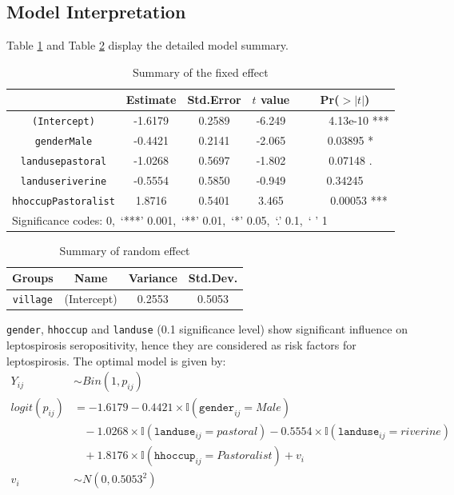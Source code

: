 \documentclass[11pt,twoside]{article}
\numberwithin{Theorem}{section}
\numberwithin{Definition}{section}
\numberwithin{Lemma}{section}
\numberwithin{Algorithm}{section}
\numberwithin{equation}{section}
\begin{document}
\subsection{Model Interpretation}

Table \ref{tab:summary2} and Table \ref{tab:summary3} display the detailed model summary.

\begin{table}[!h]
	\centering
	\begin{tabular}{|c|c|c|c|c|}
		\hline
		 & Estimate & Std.Error & $t$ value & Pr($>|t|$) \\
		\hline
		\texttt{(Intercept)} & -1.6179 & 0.2589 & -6.249 & \ \ \ \ \ 4.13e-10 *** \\
		\texttt{genderMale} & -0.4421 & 0.2141 & -2.065 & \ \ 0.03895 * \\  
		\texttt{landusepastoral} & -1.0268 & 0.5697 & -1.802 & \ \ 0.07148 . \\ 
		\texttt{landuseriverine} & -0.5554 & 0.5850 & -0.949 & 0.34245 \\    
		\texttt{hhoccupPastoralist} & 1.8716 & 0.5401 & 3.465 & \ \ \ \ \ 0.00053 *** \\
		\hline
		\multicolumn{5}{|l|}{Significance codes: 0,\ ‘***’ 0.001,\ ‘**’ 0.01,\ ‘*’ 0.05,\ ‘.’ 0.1,\ ‘ ’ 1} \\
	    \hline
	\end{tabular}
	\caption{Summary of the fixed effect}
	\label{tab:summary2}
\end{table}

\begin{table}[!h]
	\centering
	\begin{tabular}{|c|c|c|c|}
		\hline
		Groups & Name & Variance & Std.Dev. \\
		\hline
		\texttt{village} & (Intercept) & 0.2553 & 0.5053 \\
		\hline
	\end{tabular}
	\caption{Summary of random effect}
	\label{tab:summary3}
\end{table}

\texttt{gender}, \texttt{hhoccup} and \texttt{landuse} (0.1 significance level) show significant influence on leptospirosis seropositivity, hence they are considered as risk factors for leptospirosis. The optimal model is given by:
\begin{align*}
	Y_{ij} & \sim Bin(1, p_{ij}) \\
	logit(p_{ij}) &=  -1.6179 - 0.4421 \times \mathbb{I}(\texttt{gender}_{ij} = Male)  \\
	& \ \ \ \ - 1.0268 \times \mathbb{I}(\texttt{landuse}_{ij} = pastoral) - 0.5554 \times \mathbb{I}(\texttt{landuse}_{ij} = riverine) \\
	& \ \ \ \ + 1.8176 \times \mathbb{I}(\texttt{hhoccup}_{ij} = Pastoralist) + v_i \\
	v_i & \sim N(0, 0.5053^2)
\end{align*}	
\end{document}
